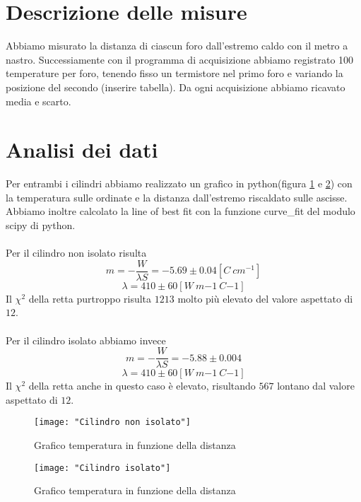 \documentclass{article}
\begin{document}
	\section{Descrizione delle misure}
		Abbiamo misurato la distanza di ciascun foro dall'estremo caldo con il metro a nastro. Successiamente con il programma di acquisizione abbiamo registrato 100 temperature per foro, tenendo fisso un termistore nel primo foro e variando la posizione del secondo (inserire tabella). Da ogni acquisizione abbiamo ricavato media e scarto.
	
	\section{Analisi dei dati}
		Per entrambi i cilindri abbiamo realizzato un grafico in python(figura \ref{fig:cilindro-non-isolato} e  \ref{fig:cilindro-isolato}) con la temperatura sulle ordinate e la distanza dall'estremo riscaldato sulle ascisse. Abbiamo inoltre calcolato la line of best fit con la funzione curve\_fit del modulo scipy di python.\\\\Per il cilindro non isolato risulta
		\begin{equation}
			m = -\frac{W}{\lambda S} = -5.69\pm0.04 [C\:cm^{-1}]
		\end{equation}
		\begin{equation}
			\lambda = 410\pm 60 [W\:m{-1}\:C{-1}]
		\end{equation}
		Il $\chi^2$ della retta purtroppo risulta $1213$ molto pi\`{u} elevato del valore aspettato di $12$.\\\\Per il cilindro isolato abbiamo invece	
		\begin{equation}
			m = -\frac{W}{\lambda S} = -5.88\pm0.004
		\end{equation}
		\begin{equation}
			\lambda = 410\pm 60 [W\:m{-1}\:C{-1}]
		\end{equation}
		Il $\chi^2$ della retta anche in questo caso \`{e} elevato, risultando $567$ lontano dal valore aspettato di $12$.
	
	\begin{figure}
		\centering
		\texttt{[image: "Cilindro non isolato"]}
		\caption{Grafico temperatura in funzione della distanza}
		\label{fig:cilindro-non-isolato}
	\end{figure}
	\begin{figure}
		\centering
		\texttt{[image: "Cilindro isolato"]}
		\caption{Grafico temperatura in funzione della distanza}
		\label{fig:cilindro-isolato}
	\end{figure}
	
\end{document}
